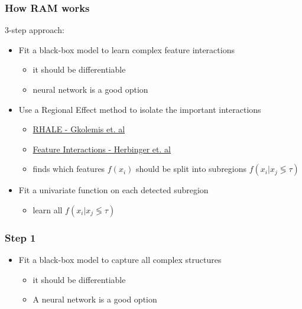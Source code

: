 \documentclass{beamer}
\begin{document}
\begin{frame}
  \frametitle{How RAM works}

  3-step approach:

  \begin{itemize}
    \item<2-4> Fit a black-box model to learn complex feature interactions
      \begin{itemize}
      \item it should be differentiable
      \item neural network is a good option
      \end{itemize}
    \item<3-4> Use a Regional Effect method to isolate the important interactions
      \begin{itemize}
      \item \href{https://givasile.github.io/assets/pdf/gkolemis23_rhale.pdf}{RHALE - Gkolemis et. al}
      \item \href{https://arxiv.org/pdf/2306.00541.pdf}{Feature Interactions - Herbinger et. al}
      \item finds which features $f(x_i)$ should be split into subregions $f(x_i | x_j \lessgtr \tau)$
      \end{itemize}
    \item<4> Fit a univariate function on each detected subregion
      \begin{itemize}
      \item learn all $f(x_i | x_j \lessgtr \tau)$
      \end{itemize}
  \end{itemize}
\end{frame}

\begin{frame}
  \frametitle{Step 1}
  \begin{itemize}
  \item Fit a black-box model to capture all complex structures
    \begin{itemize}
    \item it should be differentiable
    \item A neural network is a good option
  \end{itemize}
\end{itemize}
\end{frame}
\end{document}
